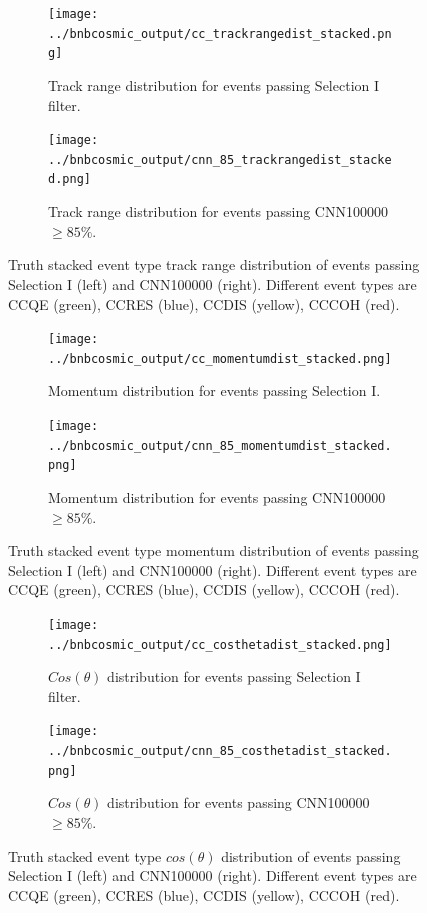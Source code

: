 \begin{figure}[htp!]
\centering
	\begin{subfigure}[b]{.475\textwidth}
	\centering
		\texttt{[image: ../bnbcosmic\_output/cc\_trackrangedist\_stacked.png]}
		\caption{Track range distribution for events passing Selection I filter.} 
		\label{fig:cctrackstacked}
	\end{subfigure}
	\quad
	\begin{subfigure}[b]{.475\textwidth}
	\centering
		\texttt{[image: ../bnbcosmic\_output/cnn\_85\_trackrangedist\_stacked.png]}
		\caption{Track range distribution for events passing CNN100000 $\geq 85\%$.} 
		\label{fig:cnn85trackstacked}
	\end{subfigure}
\caption{Truth stacked event type track range distribution of events passing Selection I (left) and CNN100000 (right). Different event types are CCQE (green), CCRES (blue), CCDIS (yellow), CCCOH (red).}
\label{fig:trackstacked}
\end{figure}

\begin{figure}[htp!]
\centering
	\begin{subfigure}[b]{.475\textwidth}
	\centering
		\texttt{[image: ../bnbcosmic\_output/cc\_momentumdist\_stacked.png]}
		\caption{Momentum distribution for events passing Selection I.} 
		\label{fig:ccmomentumstacked}
	\end{subfigure}
	\quad
	\begin{subfigure}[b]{.475\textwidth}
	\centering
		\texttt{[image: ../bnbcosmic\_output/cnn\_85\_momentumdist\_stacked.png]}
		\caption{Momentum distribution for events passing CNN100000 $\geq 85\%$.} 
		\label{fig:cnn85momentumstacked}
	\end{subfigure}
\caption{Truth stacked event type momentum distribution of events passing Selection I (left) and CNN100000 (right). Different event types are CCQE (green), CCRES (blue), CCDIS (yellow), CCCOH (red).}
\label{fig:momentumstacked}
\end{figure}

\begin{figure}[htp!]
\centering
	\begin{subfigure}[b]{.475\textwidth}
	\centering
		\texttt{[image: ../bnbcosmic\_output/cc\_costhetadist\_stacked.png]}
		\caption{$Cos(\theta)$ distribution for events passing Selection I filter.} 
		\label{fig:cccosthetastacked}
	\end{subfigure}
	\quad
	\begin{subfigure}[b]{.475\textwidth}
	\centering
		\texttt{[image: ../bnbcosmic\_output/cnn\_85\_costhetadist\_stacked.png]}
		\caption{$Cos(\theta)$ distribution for events passing CNN100000 $\geq 85\%$.} 
		\label{fig:cnn85costhetastacked}
	\end{subfigure}
\caption{Truth stacked event type $cos(\theta)$ distribution of events passing Selection I (left) and CNN100000 (right). Different event types are CCQE (green), CCRES (blue), CCDIS (yellow), CCCOH (red).}
\label{fig:costhetastacked}
\end{figure}

